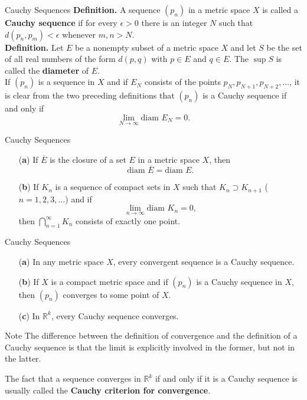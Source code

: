 \documentclass{beamer}
\begin{document}
\begin{frame}{Cauchy Sequences}
\textbf{Definition.} A sequence $(p_n)$ in a metric space $X$ is called a
\textbf{Cauchy sequence} if for every $\epsilon > 0$ there is an integer $N$ such that
$d(p_n, p_m) < \epsilon$ whenever $m, n > N$. \\ 

\textbf{Definition.} Let $E$ be a nonempty subset of a metric space $X$ and let
$S$ be the set of all real numbers of the form $d(p, q)$ with $p \in E$ and $q
\in E$. The $\sup S$ is called the \textbf{diameter} of $E$.\\ 

If $(p_n)$ is a sequence in $X$ and if $E_N$ consists of the points $p_N, p_{N+1}, p_{N+2}, \dotsc$, it is clear from the two preceding definitions that $(p_n)$ is a Cauchy sequence if and only if
\[
\lim_{N \to \infty} \text{diam } E_N = 0.
\]
\end{frame}
\begin{frame}{Cauchy Sequences}
  \begin{theorem}
\begin{enumerate}
    \item[(\textbf{a})] If $\overline{E}$ is the closure of a set $E$ in a metric space $X$, then
    \[
    \text{diam } \overline{E} = \text{diam } E.
    \]
    
    \item[(\textbf{b})] If $K_n$ is a sequence of compact sets in $X$ such that $K_n \supset K_{n+1}$ ($n = 1, 2, 3, \dotsc$) and if
    \[
    \lim_{n \to \infty} \text{diam } K_n = 0,
    \]
    then $\bigcap_{n=1}^{\infty} K_n$ consists of exactly one point.
\end{enumerate}
\end{theorem}
\end{frame} 
\begin{frame}{Cauchy Sequences}
  \begin{theorem}
\begin{enumerate}
    \item[(\textbf{a})] In any metric space $X$, every convergent sequence is a Cauchy sequence.
    \item[(\textbf{b})] If $X$ is a compact metric space and if $(p_n)$ is a Cauchy sequence in $X$, then $(p_n)$ converges to some point of $X$.
    \item[(\textbf{c})] In $\mathbb{R}^k$, every Cauchy sequence converges.
\end{enumerate}
\end{theorem}
\begin{block}{Note}
The difference between the definition of convergence and the definition of a Cauchy sequence is that the limit is explicitly involved in the former, but not in the latter.

The fact that a sequence converges in $\mathbb{R}^k$ if and only if it is a Cauchy sequence is usually called the \textbf{Cauchy criterion for convergence}.
\end{block}
\end{frame}
\end{document}
